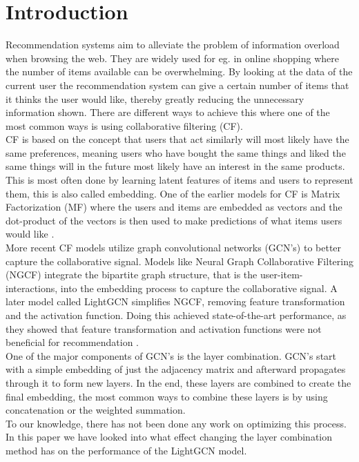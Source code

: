 \section{Introduction}

Recommendation systems aim to alleviate the problem of information overload when browsing the web.
They are widely used for eg. in online shopping where the number of items available can be overwhelming.
By looking at the data of the current user the recommendation system can give a certain number of items that it thinks the user would like, thereby greatly reducing the unnecessary information shown.
There are different ways to achieve this where one of the most common ways is using collaborative filtering (CF).
\\
CF is based on the concept that users that act similarly will most likely have the same preferences, meaning users who have bought the same things and liked the same things will in the future most likely have an interest in the same products.
This is most often done by learning latent features of items and users to represent them, this is also called embedding.
One of the earlier models for CF is Matrix Factorization (MF) where the users and items are embedded as vectors and the dot-product of the vectors is then used to make predictions of what items users would like \cite{Matrix-factorization-techniques}.
\\
More recent CF models utilize graph convolutional networks (GCN's) to better capture the collaborative signal.
Models like Neural Graph Collaborative Filtering (NGCF) integrate the bipartite graph structure, that is the user-item-interactions, into the embedding process to capture the collaborative signal\cite{NGCF_2019}.
A later model called LightGCN simplifies NGCF, removing feature transformation and the activation function.
Doing this achieved state-of-the-art performance, as they showed that feature transformation and activation functions were not beneficial for recommendation \cite{lightgcn}.
\\
One of the major components of GCN's is the layer combination.
GCN's start with a simple embedding of just the adjacency matrix and afterward propagates through it to form new layers.
In the end, these layers are combined to create the final embedding, the most common ways to combine these layers is by using concatenation or the weighted summation.
\\
To our knowledge, there has not been done any work on optimizing this process.
In this paper we have looked into what effect changing the layer combination method has on the performance of the LightGCN model.
